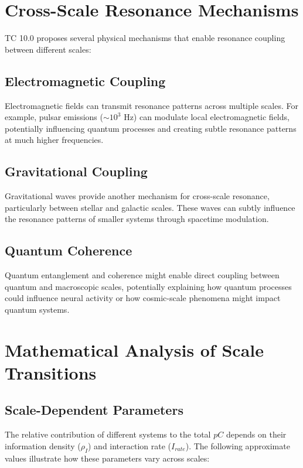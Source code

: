 \documentclass[12pt]{article}
\begin{document}
\section{Cross-Scale Resonance Mechanisms}

TC 10.0 proposes several physical mechanisms that enable resonance coupling between different scales:

\subsection{Electromagnetic Coupling}

Electromagnetic fields can transmit resonance patterns across multiple scales. For example, pulsar emissions ($\sim 10^{3}$ Hz) can modulate local electromagnetic fields, potentially influencing quantum processes and creating subtle resonance patterns at much higher frequencies.

\subsection{Gravitational Coupling}

Gravitational waves provide another mechanism for cross-scale resonance, particularly between stellar and galactic scales. These waves can subtly influence the resonance patterns of smaller systems through spacetime modulation.

\subsection{Quantum Coherence}

Quantum entanglement and coherence might enable direct coupling between quantum and macroscopic scales, potentially explaining how quantum processes could influence neural activity or how cosmic-scale phenomena might impact quantum systems.

\section{Mathematical Analysis of Scale Transitions}

\subsection{Scale-Dependent Parameters}

The relative contribution of different systems to the total $pC$ depends on their information density ($\rho_I$) and interaction rate ($I_{rate}$). The following approximate values illustrate how these parameters vary across scales:
\end{document}
